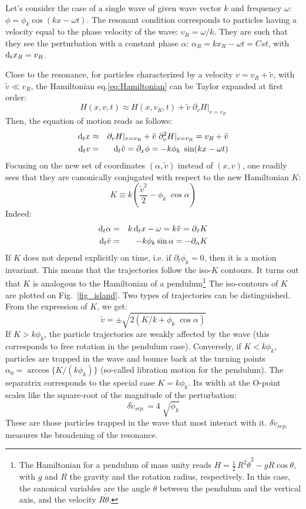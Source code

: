 \documentclass[11pt]{article}
\newcommand{\dd}{\textrm d}
\newcommand{\beq}{\begin{equation}}
\newcommand{\eeq}{\end{equation}}
\newcommand{\beqa}{\begin{eqnarray}}
\newcommand{\eeqa}{\end{eqnarray}}
\begin{document}
Let's consider the case of a single wave of given wave vector $k$ and frequency $\omega$: $\phi = \phi_k\cos(kx-\omega t)$. The resonant condition corresponds to particles having a velocity equal to the phase velocity of the wave: $v_R=\omega/k$. They are such that they see the perturbation with a constant phase $\alpha$: $\alpha_R = kx_R-\omega t=Cst$, with $\dd_t x_R=v_R$.

Close to the resonance, for particles characterized by a velocity $v=v_R+\tilde v$, with $\tilde v\ll v_R$, the Hamiltonian eq.\eqref{eq:Hamiltonian} can be Taylor expanded at first order:
\beq
H(x,v,t) \approx H(x,v_R,t) + \tilde v\; \partial_vH|_{v=v_R}
\eeq
Then, the equation of motion reads as follows:
\beqa
\dd_t x &\approx& \partial_v H|_{v=v_R} + \tilde v \; \partial^2_vH|_{v=v_R} = v_R + \tilde v \\
\dd_t v &=& \dd_t \tilde v = \partial_x\phi = - k\phi_k\; \sin(kx-\omega t)
\eeqa
Focusing on the new set of coordinates $(\alpha,\tilde v)$ instead of $(x,v)$, one readily sees that they are canonically conjugated with respect to the new Hamiltonian $K$:
\beq \label{eq:hamiltonian_K}
K\equiv k\left( \frac{\tilde v^2}{2} - \phi_k\; \cos\alpha \right)
\eeq
Indeed:
\beqa
\dd_t \alpha &=& k\, \dd_t x - \omega =k \tilde v = \partial_{\tilde v} K \\
\dd_t \tilde v &=& - k \phi_k \sin\alpha = -\partial_\alpha K
\eeqa
If $K$ does not depend explicitly on time, i.e. if $\partial_t\phi_k=0$, then it is a motion invariant. This means that the trajectories follow the iso-$K$ contours. It turns out that $K$ is analogous to the Hamiltonian of a pendulum\footnote{The Hamiltonian for a pendulum of mass unity reads $H=\frac{1}{2}\,R^2\dot{\theta}^2 -g R \cos\theta$, with $g$ and $R$ the gravity and the rotation radius, respectively. In this case, the canonical variables are the angle $\theta$ between the pendulum and the vertical axis, and the velocity $R\dot{\theta}$.}
The iso-contours of $K$ are plotted on Fig.~\ref{fig_island}. Two types of trajectories can be distinguished. From the expression of $K$, we get:
\beq
\tilde v = \pm  \sqrt{2(K/k+\phi_k\; \cos\alpha)}
\eeq
If $K>k\phi_k$, the particle trajectories are weakly affected by the wave (this corresponds to free rotation in the pendulum case). Conversely, if $K<k\phi_k$, particles are trapped in the wave and bounce back at the turning points $\alpha_0 =\arccos \{K/(k\phi_k)\}$ (so-called libration motion for the pendulum). The separatrix corresponds to the special case $K=k\phi_k$. Its width at the O-point scales like the square-root of the magnitude of the perturbation:
\beq
\delta \tilde v_{sep.} = 4\; \sqrt{\phi_k}
\eeq
These are those particles trapped in the wave that most interact with it. $\delta \tilde v_{sep.}$ measures the broadening of the resonance.
\end{document}
